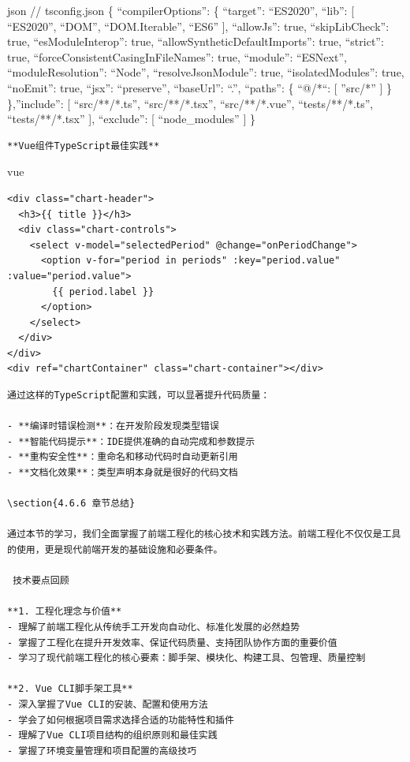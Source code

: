 {{json // tsconfig.json \{ ``compilerOptions'': \{ ``target'': ``ES2020'', ``lib'': {[} ``ES2020'', ``DOM'', ``DOM.Iterable'', ``ES6'' {]}, ``allowJs'': true, ``skipLibCheck'': true, ``esModuleInterop'': true, ``allowSyntheticDefaultImports'': true, ``strict'': true, ``forceConsistentCasingInFileNames'': true, ``module'': ``ESNext'', ``moduleResolution'': ``Node'', ``resolveJsonModule'': true, ``isolatedModules'': true, ``noEmit'': true, ``jsx'': ``preserve'', ``baseUrl'': ``.'', ``paths'': \{ ``@/*``: {[} ''src/*'' {]} \} \},''include'': {[} ``src/**/*.ts'', ``src/**/*.tsx'', ``src/**/*.vue'', ``tests/**/*.ts'', ``tests/**/*.tsx'' {]}, ``exclude'': {[} ``node\_modules'' {]} \}

\begin{lstlisting}
**Vue组件TypeScript最佳实践**
\end{lstlisting}

vue

\begin{verbatim}
<div class="chart-header">
  <h3>{{ title }}</h3>
  <div class="chart-controls">
    <select v-model="selectedPeriod" @change="onPeriodChange">
      <option v-for="period in periods" :key="period.value" :value="period.value">
        {{ period.label }}
      </option>
    </select>
  </div>
</div>
<div ref="chartContainer" class="chart-container"></div>
\end{verbatim}

\begin{lstlisting}
通过这样的TypeScript配置和实践，可以显著提升代码质量：

- **编译时错误检测**：在开发阶段发现类型错误
- **智能代码提示**：IDE提供准确的自动完成和参数提示
- **重构安全性**：重命名和移动代码时自动更新引用
- **文档化效果**：类型声明本身就是很好的代码文档

\section{4.6.6 章节总结}

通过本节的学习，我们全面掌握了前端工程化的核心技术和实践方法。前端工程化不仅仅是工具的使用，更是现代前端开发的基础设施和必要条件。

 技术要点回顾

**1. 工程化理念与价值**
- 理解了前端工程化从传统手工开发向自动化、标准化发展的必然趋势
- 掌握了工程化在提升开发效率、保证代码质量、支持团队协作方面的重要价值
- 学习了现代前端工程化的核心要素：脚手架、模块化、构建工具、包管理、质量控制

**2. Vue CLI脚手架工具**
- 深入掌握了Vue CLI的安装、配置和使用方法
- 学会了如何根据项目需求选择合适的功能特性和插件
- 理解了Vue CLI项目结构的组织原则和最佳实践
- 掌握了环境变量管理和项目配置的高级技巧


\end{lstlisting}}}
